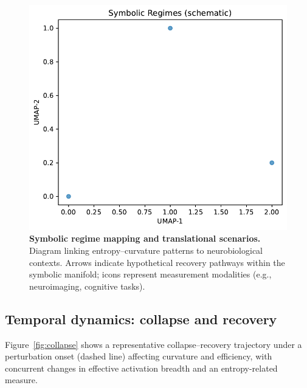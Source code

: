 \documentclass[fleqn,10pt]{wlscirep}
\begin{document}
\begin{figure}[htbp]\centering
\includegraphics[width=\linewidth]{Fig_symbolic_regimes_map.pdf}
\caption{\textbf{Symbolic regime mapping and translational scenarios.} Diagram linking entropy--curvature patterns to neurobiological contexts. Arrows indicate hypothetical recovery pathways within the symbolic manifold; icons represent measurement modalities (e.g., neuroimaging, cognitive tasks).}
\label{fig:map}
\end{figure}

\subsection*{Temporal dynamics: collapse and recovery}
Figure~\ref{fig:collapse} shows a representative collapse--recovery trajectory under a perturbation onset (dashed line) affecting curvature and efficiency, with concurrent changes in effective activation breadth and an entropy-related measure.
\end{document}
